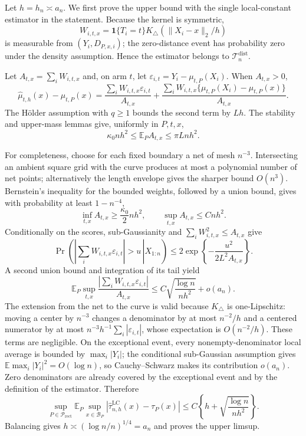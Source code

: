 Let \(h=h_n\asymp a_n\).  We first prove the upper bound with the single local-constant estimator in the statement.  Because the kernel is symmetric,
\[
W_{i,t,x}=\mathbf 1\{T_i=t\}K_\triangle(\lVert X_i-x\rVert_2/h)
\]
is measurable from \((Y_i,D_{P,x,i})\); the zero-distance event has probability zero under the density assumption.  Hence the estimator belongs to \(\mathcal T_n^{\mathrm{dist}}\).

Let \(A_{t,x}=\sum_iW_{i,t,x}\) and, on arm \(t\), let \(\varepsilon_{i,t}=Y_i-\mu_{t,P}(X_i)\).  When \(A_{t,x}>0\),
\[
\widehat\mu_{t,h}(x)-\mu_{t,P}(x)
=\frac{\sum_iW_{i,t,x}\varepsilon_{i,t}}{A_{t,x}}
+\frac{\sum_iW_{i,t,x}\{\mu_{t,P}(X_i)-\mu_{t,P}(x)\}}{A_{t,x}}.
\]
The H\"older assumption with \(q\geq1\) bounds the second term by \(Lh\).  The stability and upper-mass lemmas give, uniformly in \(P,t,x\),
\[
\kappa_0nh^2\leq\mathbb E_PA_{t,x}\leq\pi Lnh^2.
\]

For completeness, choose for each fixed boundary a net of mesh \(n^{-3}\).  Intersecting an ambient square grid with the curve produces at most a polynomial number of net points; alternatively the length envelope gives the sharper bound \(O(n^3)\).  Bernstein's inequality for the bounded weights, followed by a union bound, gives with probability at least \(1-n^{-4}\),
\[
\inf_{t,x}A_{t,x}\geq\frac{\kappa_0}{2}nh^2,
\qquad
\sup_{t,x}A_{t,x}\leq Cnh^2.
\]
Conditionally on the scores, sub-Gaussianity and \(\sum_iW_{i,t,x}^2\leq A_{t,x}\) give
\[
\Pr\!\left(\left.\left|\sum_iW_{i,t,x}\varepsilon_{i,t}\right|>u\,\right|X_{1:n}\right)
\leq2\exp\!\left\{-\frac{u^2}{2L^2A_{t,x}}\right\}.
\]
A second union bound and integration of its tail yield
\[
\mathbb E_P\sup_{t,x}
\frac{\left|\sum_iW_{i,t,x}\varepsilon_{i,t}\right|}{A_{t,x}}
\leq C\sqrt{\frac{\log n}{nh^2}}+o(a_n).
\]
The extension from the net to the curve is valid because \(K_\triangle\) is one-Lipschitz: moving a center by \(n^{-3}\) changes a denominator by at most \(n^{-2}/h\) and a centered numerator by at most \(n^{-3}h^{-1}\sum_i|\varepsilon_{i,t}|\), whose expectation is \(O(n^{-2}/h)\).  These terms are negligible.  On the exceptional event, every nonempty-denominator local average is bounded by \(\max_i|Y_i|\); the conditional sub-Gaussian assumption gives \(\mathbb E\max_i|Y_i|^2=O(\log n)\), so Cauchy--Schwarz makes its contribution \(o(a_n)\).  Zero denominators are already covered by the exceptional event and by the definition of the estimator.  Therefore
\[
\sup_{P\in\mathcal P_{\mathrm{rect}}}
\mathbb E_P\sup_{x\in\mathcal B_P}
|\widehat\tau^{\mathrm{LC}}_{n,h}(x)-\tau_P(x)|
\leq C\left\{h+\sqrt{\frac{\log n}{nh^2}}\right\}.
\]
Balancing gives \(h\asymp(\log n/n)^{1/4}=a_n\) and proves the upper limsup.

